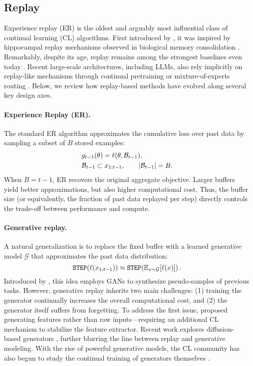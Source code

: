 \documentclass[10pt]{article} %
\begin{document}
\subsection{Replay}
\label{ssec:replay}

Experience replay (ER) is the oldest and arguably most influential class of continual learning (CL) algorithms.  
First introduced by \citet{robinsCatastrophicForgettingNeural1993,robinsCatastrophicForgettingRehearsal1995}, it was inspired by hippocampal replay mechanisms observed in biological memory consolidation \citep{hayesReplayDeepLearning2021}.  
Remarkably, despite its age, replay remains among the strongest baselines even today \citep{buzzegaRethinkingExperienceReplay2020,buzzegaDarkExperienceGeneral2020}.  
Recent large-scale architectures, including LLMs, also rely implicitly on replay-like mechanisms through continual pretraining or mixture-of-experts routing .  
Below, we review how replay-based methods have evolved along several key design axes.

\paragraph{Experience Replay (ER).}  
The standard ER algorithm approximates the cumulative loss over past data by sampling a subset of $B$ stored examples:
\begin{align*}
& g_{t-1}(\theta) = \ell(\theta, \mathcal{B}_{t-1}), \\
& \mathcal{B}_{t-1} \subset x_{1:t-1}, \qquad |\mathcal{B}_{t-1}| = B.
\end{align*}
When $B = t-1$, ER recovers the original aggregate objective.  
Larger buffers yield better approximations, but also higher computational cost.  
Thus, the buffer size (or equivalently, the fraction of past data replayed per step) directly controls the trade-off between performance and compute.

\paragraph{Generative replay.}
A natural generalization is to replace the fixed buffer with a learned generative model $\mathcal{G}$ that approximates the past data distribution:
\[
\texttt{STEP}(\ell(x_{1:t-1})) 
\approx \texttt{STEP}\!\left(\mathbb{E}_{x \sim \mathcal{G}}[\ell(x)]\right).
\]
Introduced by \citet{shinContinualLearningDeep2017}, this idea employs GANs to synthesize pseudo-samples of previous tasks.  
However, generative replay inherits two main challenges:  
(1) training the generator continually increases the overall computational cost, and  
(2) the generator itself suffers from forgetting.  
To address the first issue, \citet{liuGenerativeFeatureReplay2020} proposed generating features rather than raw inputs—requiring an additional CL mechanism to stabilize the feature extractor.  
Recent work explores diffusion-based generators \citep{gaoDDGRContinualLearning2023,kimDiffusionMeetsFewshot2025}, further blurring the line between replay and generative modeling.  
With the rise of powerful generative models, the CL community has also begun to study the continual training of generators themselves \citep{guoComprehensiveSurveyContinual2025}.
\end{document}
